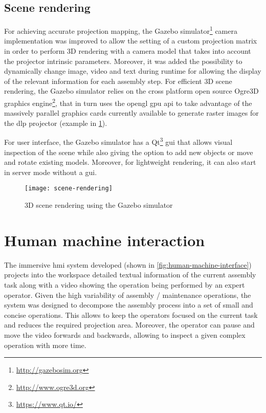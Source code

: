 

\subsection{Scene rendering}

For achieving accurate projection mapping, the Gazebo simulator\footnote{\url{http://gazebosim.org}} camera implementation was improved to allow the setting of a custom projection matrix in order to perform 3D rendering with a camera model that takes into account the projector intrinsic parameters. Moreover, it was added the possibility to dynamically change image, video and text during runtime for allowing the display of the relevant information for each assembly step.
For efficient 3D scene rendering, the Gazebo simulator relies on the cross platform open source Ogre3D graphics engine\footnote{\url{http://www.ogre3d.org}}, that in turn uses the \gls{opengl} \gls{gpu} \gls{api} to take advantage of the massively parallel graphics cards currently available to generate raster images for the \gls{dlp} projector (example in \cref{fig:scene-rendering}).

For user interface, the Gazebo simulator has a Qt\footnote{\url{https://www.qt.io/}} \gls{gui} that allows visual inspection of the scene while also giving the option to add new objects or move and rotate existing models. Moreover, for lightweight rendering, it can also start in server mode without a \gls{gui}.

\begin{figure}
	\centering
	\texttt{[image: scene-rendering]}
	\caption{3D scene rendering using the Gazebo simulator}
	\label{fig:scene-rendering}
\end{figure}



\section{Human machine interaction}

The immersive \gls{hmi} system developed (shown in \cref{fig:human-machine-interface}) projects into the workspace detailed textual information of the current assembly task along with a video showing the operation being performed by an expert operator. Given the high variability of assembly / maintenance operations, the system was designed to decompose the assembly process into a set of small and concise operations. This allows to keep the operators focused on the current task and reduces the required projection area. Moreover, the operator can pause and move the video forwards and backwards, allowing to inspect a given complex operation with more time.

